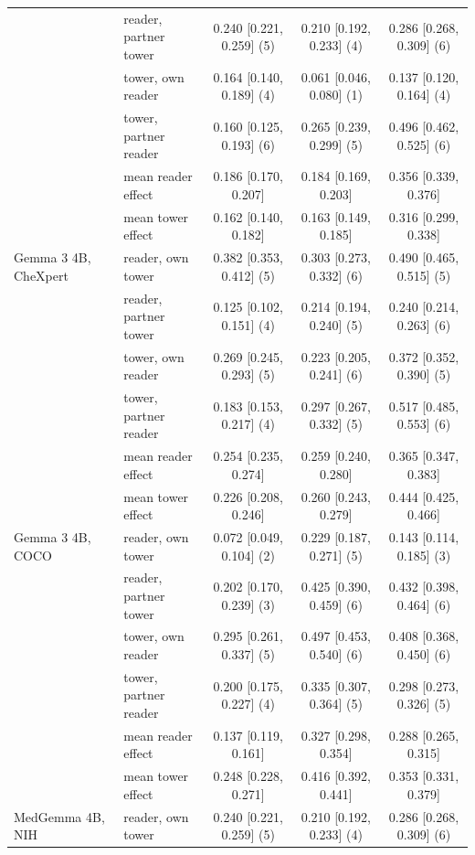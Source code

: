 \begin{table}[htbp]
{\begin{tabular}{llccc}
 & reader, partner tower & 0.240 [0.221, 0.259] (5) & 0.210 [0.192, 0.233] (4) & 0.286 [0.268, 0.309] (6) \\
 & tower, own reader & 0.164 [0.140, 0.189] (4) & 0.061 [0.046, 0.080] (1) & 0.137 [0.120, 0.164] (4) \\
 & tower, partner reader & 0.160 [0.125, 0.193] (6) & 0.265 [0.239, 0.299] (5) & 0.496 [0.462, 0.525] (6) \\
 & \quad mean reader effect & 0.186 [0.170, 0.207] & 0.184 [0.169, 0.203] & 0.356 [0.339, 0.376] \\
 & \quad mean tower effect & 0.162 [0.140, 0.182] & 0.163 [0.149, 0.185] & 0.316 [0.299, 0.338] \\
\addlinespace
Gemma 3 4B, CheXpert & reader, own tower & 0.382 [0.353, 0.412] (5) & 0.303 [0.273, 0.332] (6) & 0.490 [0.465, 0.515] (5) \\
 & reader, partner tower & 0.125 [0.102, 0.151] (4) & 0.214 [0.194, 0.240] (5) & 0.240 [0.214, 0.263] (6) \\
 & tower, own reader & 0.269 [0.245, 0.293] (5) & 0.223 [0.205, 0.241] (6) & 0.372 [0.352, 0.390] (5) \\
 & tower, partner reader & 0.183 [0.153, 0.217] (4) & 0.297 [0.267, 0.332] (5) & 0.517 [0.485, 0.553] (6) \\
 & \quad mean reader effect & 0.254 [0.235, 0.274] & 0.259 [0.240, 0.280] & 0.365 [0.347, 0.383] \\
 & \quad mean tower effect & 0.226 [0.208, 0.246] & 0.260 [0.243, 0.279] & 0.444 [0.425, 0.466] \\
\addlinespace
Gemma 3 4B, COCO & reader, own tower & 0.072 [0.049, 0.104] (2) & 0.229 [0.187, 0.271] (5) & 0.143 [0.114, 0.185] (3) \\
 & reader, partner tower & 0.202 [0.170, 0.239] (3) & 0.425 [0.390, 0.459] (6) & 0.432 [0.398, 0.464] (6) \\
 & tower, own reader & 0.295 [0.261, 0.337] (5) & 0.497 [0.453, 0.540] (6) & 0.408 [0.368, 0.450] (6) \\
 & tower, partner reader & 0.200 [0.175, 0.227] (4) & 0.335 [0.307, 0.364] (5) & 0.298 [0.273, 0.326] (5) \\
 & \quad mean reader effect & 0.137 [0.119, 0.161] & 0.327 [0.298, 0.354] & 0.288 [0.265, 0.315] \\
 & \quad mean tower effect & 0.248 [0.228, 0.271] & 0.416 [0.392, 0.441] & 0.353 [0.331, 0.379] \\
\addlinespace
MedGemma 4B, NIH & reader, own tower & 0.240 [0.221, 0.259] (5) & 0.210 [0.192, 0.233] (4) & 0.286 [0.268, 0.309] (6) \\

\end{tabular}}
\end{table}
